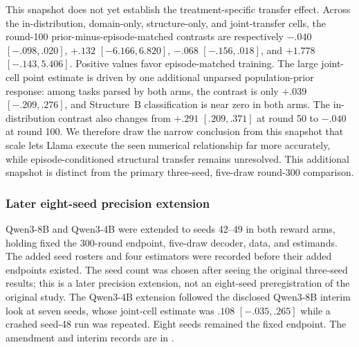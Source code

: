 This snapshot does not yet establish the treatment-specific transfer effect.
Across the in-distribution, domain-only, structure-only, and joint-transfer
cells, the round-100 prior-minus-episode-matched contrasts are respectively
$-.040$ $[-.098,.020]$, $+.132$ $[-6.166,6.820]$, $-.068$
$[-.156,.018]$, and $+1.778$ $[-.143,5.406]$. Positive values favor
episode-matched training. The large joint-cell point estimate is driven by one
additional unparsed population-prior response: among tasks parsed by both arms,
the contrast is only $+.039$ $[-.209,.276]$, and Structure~B classification is
near zero in both arms. The in-distribution contrast also changes from $+.291$
$[.209,.371]$ at round 50 to $-.040$ at round 100. We therefore draw the
narrow conclusion from this snapshot that scale lets Llama execute the seen numerical
relationship far more accurately, while episode-conditioned structural
transfer remains unresolved. This additional snapshot is distinct from
the primary three-seed, five-draw round-300 comparison.

\begin{center}
\begin{minipage}{\linewidth}
\centering
{}
\label{tab:exp3-coin-complete-roster}
\scriptsize
\setlength{\tabcolsep}{3pt}
\resizebox{\linewidth}{!}{}
\end{minipage}
\end{center}


\subsubsection{Later eight-seed precision extension}
\label{app:exp3-eight-seed}

Qwen3-8B and Qwen3-4B were extended to seeds 42--49 in both reward arms, holding
fixed the 300-round endpoint, five-draw decoder, data, and estimands. The added
seed rosters and four estimators were recorded before their added endpoints
existed. The seed count was chosen after seeing the original three-seed results;
this is a later precision extension, not an eight-seed preregistration of the
original study. The Qwen3-4B extension followed the disclosed Qwen3-8B interim
look at seven seeds, whose joint-cell estimate was $.108$ $[-.035,.265]$ while
a crashed seed-48 run was repeated. Eight seeds remained the fixed endpoint.
The amendment and interim records are in
.

